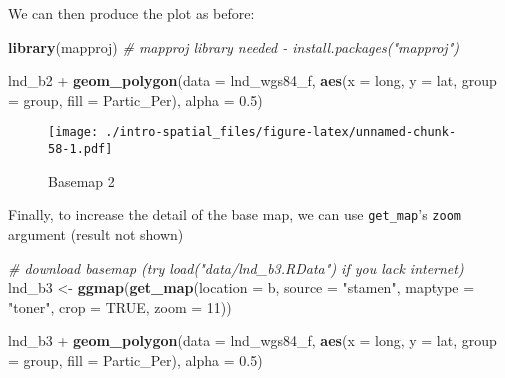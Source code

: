 \documentclass[]{article}
\newenvironment{Shaded}{}{}
\newcommand{\KeywordTok}[1]{\textcolor[rgb]{0.00,0.44,0.13}{\textbf{{#1}}}}
\newcommand{\DataTypeTok}[1]{\textcolor[rgb]{0.56,0.13,0.00}{{#1}}}
\newcommand{\DecValTok}[1]{\textcolor[rgb]{0.25,0.63,0.44}{{#1}}}
\newcommand{\FloatTok}[1]{\textcolor[rgb]{0.25,0.63,0.44}{{#1}}}
\newcommand{\StringTok}[1]{\textcolor[rgb]{0.25,0.44,0.63}{{#1}}}
\newcommand{\CommentTok}[1]{\textcolor[rgb]{0.38,0.63,0.69}{\textit{{#1}}}}
\newcommand{\OtherTok}[1]{\textcolor[rgb]{0.00,0.44,0.13}{{#1}}}
\newcommand{\NormalTok}[1]{{#1}}
\begin{document}
We can then produce the plot as before:

\begin{Shaded}
\begin{Highlighting}[]
\KeywordTok{library}\NormalTok{(mapproj) }\CommentTok{# mapproj library needed - install.packages("mapproj")}

\NormalTok{lnd_b2 +}
\StringTok{  }\KeywordTok{geom_polygon}\NormalTok{(}\DataTypeTok{data =} \NormalTok{lnd_wgs84_f,}
               \KeywordTok{aes}\NormalTok{(}\DataTypeTok{x =} \NormalTok{long, }\DataTypeTok{y =} \NormalTok{lat, }\DataTypeTok{group =} \NormalTok{group, }\DataTypeTok{fill =} \NormalTok{Partic_Per),}
               \DataTypeTok{alpha =} \FloatTok{0.5}\NormalTok{)}
\end{Highlighting}
\end{Shaded}

\begin{figure}[htbp]
\centering
\texttt{[image: ./intro-spatial\_files/figure-latex/unnamed-chunk-58-1.pdf]}
\caption{Basemap 2}
\end{figure}

Finally, to increase the detail of the base map, we can use
\texttt{get\_map}'s \texttt{zoom} argument (result not shown)

\begin{Shaded}
\begin{Highlighting}[]
\CommentTok{# download basemap (try load("data/lnd_b3.RData") if you lack internet)}
\NormalTok{lnd_b3 <-}\StringTok{ }\KeywordTok{ggmap}\NormalTok{(}\KeywordTok{get_map}\NormalTok{(}\DataTypeTok{location =} \NormalTok{b, }\DataTypeTok{source =} \StringTok{"stamen"}\NormalTok{,}
  \DataTypeTok{maptype =} \StringTok{"toner"}\NormalTok{, }\DataTypeTok{crop =} \OtherTok{TRUE}\NormalTok{, }\DataTypeTok{zoom =} \DecValTok{11}\NormalTok{))}
\end{Highlighting}
\end{Shaded}

\begin{Shaded}
\begin{Highlighting}[]
\NormalTok{lnd_b3 +}
\StringTok{  }\KeywordTok{geom_polygon}\NormalTok{(}\DataTypeTok{data =} \NormalTok{lnd_wgs84_f,}
               \KeywordTok{aes}\NormalTok{(}\DataTypeTok{x =} \NormalTok{long, }\DataTypeTok{y =} \NormalTok{lat, }\DataTypeTok{group =} \NormalTok{group, }\DataTypeTok{fill =} \NormalTok{Partic_Per),}
               \DataTypeTok{alpha =} \FloatTok{0.5}\NormalTok{)}
\end{Highlighting}
\end{Shaded}
\end{document}
